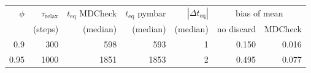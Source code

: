 \begin{tabular}{rrrrrrr}
\toprule
$\phi$ & $\tau_{\mathrm{relax}}$ & $t_{\mathrm{eq}}$ MDCheck & $t_{\mathrm{eq}}$ pymbar & $|\Delta t_{\mathrm{eq}}|$ & \multicolumn{2}{c}{bias of mean} \\
 & (steps) & (median) & (median) & (median) & no discard & MDCheck \\
\midrule
0.9 & 300 & 598 & 593 & 1 & 0.150 & 0.016 \\
0.95 & 1000 & 1851 & 1853 & 2 & 0.495 & 0.077 \\
\bottomrule
\end{tabular}
